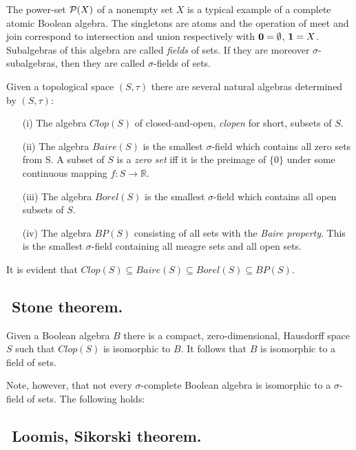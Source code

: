 The power-set ${{\mathcal P}}(X)$ of a nonempty set $X$ is a typical example of a complete atomic Boolean algebra. The singletons are
atoms and the operation of meet and join correspond to intersection and union respectively with $\hbox{\bf 0}=\emptyset$,
$\hbox{\bf 1}=X$. Subalgebras of this algebra are called \emph{fields} of sets. If they are moreover $\sigma$-subalgebras, then
they are called $\sigma$-fields  of sets.

\begin{example} Given a topological space $(S,\tau)$ there are several natural algebras determined by $(S,\tau)$:
\begin{itemize}
 \item[(i)]  The algebra $Clop(S)$ of closed-and-open, \emph{clopen} for short, subsets of $S$.
 \item[(ii)]  The algebra $Baire(S)$ is the smallest $\sigma$-field which contains all zero sets from S.
             A subset of $S$ is a \emph{zero set} iff it is the preimage of $\{0\}$ under some continuous
             mapping $f:S\to{\mathbb R}$.
 \item[(iii)]  The algebra $Borel(S)$ is the smallest $\sigma$-field which contains all open subsets of $S$.
 \item[(iv)]  The algebra $BP(S)$ consisting of all sets with the \emph{Baire property}. This is the
             smallest $\sigma$-field containing all meagre sets and all open sets.
\end{itemize}
It is evident that $Clop(S)\subseteq Baire(S)\subseteq Borel(S)\subseteq BP(S)$.
\end{example}

\subsection{${}$ \hspace{-1em}Stone theorem.}\label{stone}

Given a Boolean algebra $B$ there is a compact, zero-dimensional, Hausdorff space $S$
such that $Clop(S)$ is isomorphic to $B$. It follows that $B$ is isomorphic to a field of sets.
\smallskip

Note, however, that not every $\sigma$-complete Boolean algebra is isomorphic to a $\sigma$-field of sets.
The following holds:

\subsection{${}$ \hspace{-1em}Loomis, Sikorski theorem.}\label{loomis-sikorski}

